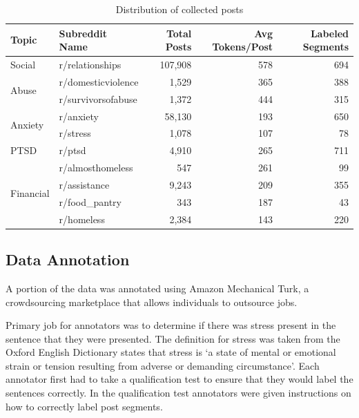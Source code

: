 \documentclass[10pt, a4paper]{article}
\begin{document}
\begin{table}
    \caption{Distribution of collected posts}
    \label{tab:dataset-distribution}
    \begin{center}
        \begin{tabular}{|l|l|r|r|r|}
            \hline
            \textbf{Topic} & \textbf{Subreddit Name} & \textbf{Total Posts} & \textbf{Avg Tokens/Post} & \textbf{Labeled Segments}\\
            \hline
            Social                     & r/relationships    & 107,908 & 578 & 694 \\ \hline
            \multirow{2}{*}{Abuse}     & r/domesticviolence & 1,529   & 365 & 388 \\
                                       & r/survivorsofabuse & 1,372   & 444 & 315 \\ \hline
            \multirow{2}{*}{Anxiety}   & r/anxiety          & 58,130  & 193 & 650 \\
                                       & r/stress           & 1,078   & 107 & 78  \\ \hline
            PTSD                       & r/ptsd             & 4,910   & 265 & 711 \\ \hline
            \multirow{4}{*}{Financial} & r/almosthomeless   & 547     & 261 & 99  \\
                                       & r/assistance       & 9,243   & 209 & 355 \\
                                       & r/food\_pantry     & 343     & 187 & 43  \\
                                       & r/homeless         & 2,384   & 143 & 220 \\ \hline
        \end{tabular}
    \end{center}
\end{table}

\subsection{Data Annotation}

A portion of the data was annotated using Amazon Mechanical Turk, a crowdsourcing marketplace that allows individuals to outsource jobs.

Primary job for annotators was to determine if there was stress present in the sentence that they were presented.
The definition for stress was taken from the Oxford English Dictionary states that stress is `a state of mental or emotional strain or tension resulting from adverse or demanding circumstance'.
Each annotator first had to take a qualification test to ensure that they would label the sentences correctly.
In the qualification test annotators were given instructions on how to correctly label post segments.
\end{document}

